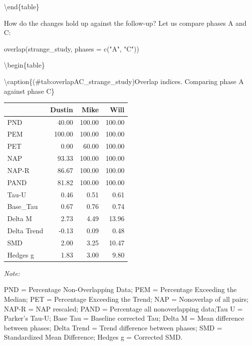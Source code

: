 \documentclass[
]{book}
\newenvironment{Shaded}{\begin{snugshade}}{\end{snugshade}}
\newcommand{\AttributeTok}[1]{\textcolor[rgb]{0.77,0.63,0.00}{#1}}
\newcommand{\FunctionTok}[1]{\textcolor[rgb]{0.00,0.00,0.00}{#1}}
\newcommand{\NormalTok}[1]{#1}
\newcommand{\StringTok}[1]{\textcolor[rgb]{0.31,0.60,0.02}{#1}}
\begin{document}
\textbackslash end\{table\}

How do the changes hold up against the follow-up? Let us compare phases A and C:

\begin{Shaded}
\begin{Highlighting}[]
\FunctionTok{overlap}\NormalTok{(strange\_study, }\AttributeTok{phases =} \FunctionTok{c}\NormalTok{(}\StringTok{"A"}\NormalTok{, }\StringTok{"C"}\NormalTok{))}
\end{Highlighting}
\end{Shaded}

\textbackslash begin\{table\}

\textbackslash caption\{(\#tab:overlapAC\_strange\_study)Overlap indices. Comparing phase A against phase C\}
\centering

\begin{threeparttable}
\begin{tabular}[t]{lrrr}
\toprule
  & Dustin & Mike & Will\\
\midrule
PND & 40.00 & 100.00 & 100.00\\
PEM & 100.00 & 100.00 & 100.00\\
PET & 0.00 & 60.00 & 100.00\\
NAP & 93.33 & 100.00 & 100.00\\
NAP-R & 86.67 & 100.00 & 100.00\\
PAND & 81.82 & 100.00 & 100.00\\
Tau-U & 0.46 & 0.51 & 0.61\\
Base\_Tau & 0.67 & 0.76 & 0.74\\
Delta M & 2.73 & 4.49 & 13.96\\
Delta Trend & -0.13 & 0.09 & 0.48\\
SMD & 2.00 & 3.25 & 10.47\\
Hedges g & 1.83 & 3.00 & 9.80\\
\bottomrule
\end{tabular}
\begin{tablenotes}
\item \textit{Note: } 
\item PND = Percentage Non-Overlapping Data; PEM = Percentage Exceeding the Median; PET = Percentage Exceeding the Trend; NAP = Nonoverlap of all pairs; NAP-R = NAP rescaled; PAND = Percentage all nonoverlapping data;Tau U = Parker's Tau-U; Base Tau = Baseline corrected Tau; Delta M = Mean difference between phases; Delta Trend = Trend difference between phases; SMD = Standardized Mean Difference; Hedges g = Corrected SMD.
\end{tablenotes}
\end{threeparttable}
\end{document}
